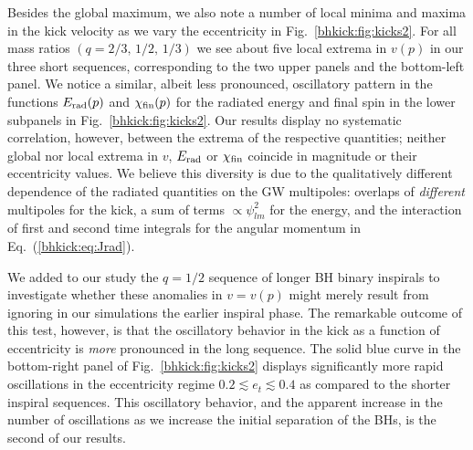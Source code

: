 Besides the global maximum, we also note a number of local minima and
maxima in the kick velocity as we vary the eccentricity in
Fig.~\ref{bhkick:fig:kicks2}. For all mass ratios $(q=2/3,\,1/2,\,1/3)$ we
see about five 
local extrema in $v(p)$ in our three short sequences,
corresponding to the two upper panels and the bottom-left panel.
We notice a similar, albeit less pronounced,
oscillatory pattern in the functions
$E_{\rm rad}(p)$ and $\chi_{\rm fin}(p)$ for the radiated
energy and final spin in the lower subpanels in
Fig.~\ref{bhkick:fig:kicks2}. Our results display no systematic
correlation, however, between the extrema of the respective
quantities; neither global nor local extrema in $v$,
$E_{\rm rad}$ or $\chi_{\rm fin}$ coincide in
magnitude or their eccentricity values.
We believe this diversity is due to the qualitatively
different dependence of the radiated quantities on the
GW multipoles: overlaps of {\it different} multipoles for the
kick, a sum of terms $\propto \psi_{lm}^2$ for the energy,
and the interaction of first and second time integrals
for the angular momentum in Eq.~(\ref{bhkick:eq:Jrad}).

We added
to our study the $q = 1/2$ sequence of longer BH binary inspirals to
investigate whether these anomalies in $v=v(p)$ might merely result
from ignoring in our simulations the earlier inspiral phase. The
remarkable outcome of this test, however, is that the oscillatory
behavior in the kick as a function of eccentricity is \emph{more}
pronounced in the long sequence.  The solid blue curve in the
bottom-right panel of Fig.~\ref{bhkick:fig:kicks2} displays significantly more
rapid oscillations in the eccentricity regime
$0.2\lesssim e_t \lesssim 0.4$ as compared to the shorter inspiral
sequences.  This oscillatory behavior, and the apparent increase in
the number of oscillations as we increase the initial separation of
the BHs, is the second of our results.


